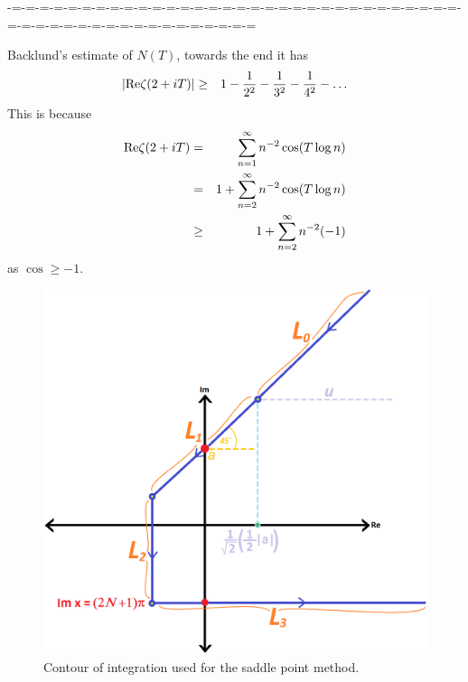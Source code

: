\documentclass[aps,preprint,preprintnumbers,nofootinbib,showpacs,prd]{revtex4-1}
\newcommand{\nbea}{\begin{eqnarray*}}
\newcommand{\neea}{\end{eqnarray*}}
\newcommand{\re}{{\rm Re}}
\begin{document}
-=-=-=-=-=-=-=-=-=-=-=-=-=-=-=-=-=-=-=-=-=-=-=-=-=-=-=-=-=-=-=-=-=-=-=-=-=-=-=-=-=-=-=-=-=-=-=-=-=-=


Backlund's estimate of $N(T)$, towards the end it has
%
\nbea
\left | \re\zeta(2 + iT)\right | & \ge & 1 - \frac{1}{2^2} - \frac{1}{3^2}- \frac{1}{4^2} - \dots
\neea
%
This is because
%
\nbea
\re\zeta(2 + iT) & = & \sum_{n=1}^\infty n^{-2} \cos(T\log n) \\
& = & 1 + \sum_{n=2}^\infty n^{-2} \cos(T\log n) \\
& \ge & 1 + \sum_{n=2}^\infty n^{-2} (-1)
\neea
%
as $\cos \ge -1$.



































%
\begin{figure}
\centering
  \includegraphics[width=1.00\linewidth]{Saddle_Point_Contour.png}
  \caption{Contour of integration used for the saddle point method.}
\label{fig:Saddle_Point_Contour}
\end{figure}
%
\end{document}
